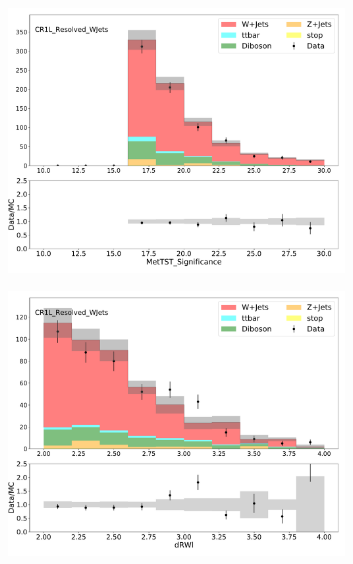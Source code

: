 \begin{figure}[htbp]
\begin{subfigure}{0.49\textwidth}
     \includegraphics[width = 0.98\textwidth]{Figures/4/datamc/CR1L_Resolved_WJets/MetTST_Significance.pdf}
     \caption{\metsig}
     \end{subfigure}
     \begin{subfigure}{0.49\textwidth}
     \includegraphics[width = 0.98\textwidth]{Figures/4/datamc/CR1L_Resolved_WJets/dRWl.pdf}
     \caption{\drWl}
     \end{subfigure}
     \begin{subfigure}{0.49\textwidth}

\end{subfigure}
\end{figure}
